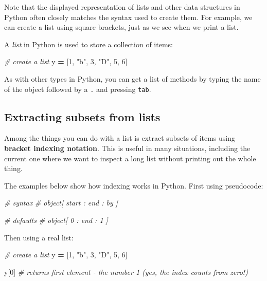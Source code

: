\documentclass[]{book}
\newenvironment{Shaded}{\begin{snugshade}}{\end{snugshade}}
\newcommand{\CommentTok}[1]{\textcolor[rgb]{0.56,0.35,0.01}{\textit{#1}}}
\newcommand{\DecValTok}[1]{\textcolor[rgb]{0.00,0.00,0.81}{#1}}
\newcommand{\NormalTok}[1]{#1}
\newcommand{\OperatorTok}[1]{\textcolor[rgb]{0.81,0.36,0.00}{\textbf{#1}}}
\newcommand{\StringTok}[1]{\textcolor[rgb]{0.31,0.60,0.02}{#1}}
\begin{document}
Note that the displayed representation of lists and other data structures in Python often closely matches the syntax used to create them. For example, we can create a list using square brackets, just as we see when we print a list.

A \emph{list} in Python is used to store a collection of items:

\begin{Shaded}
\begin{Highlighting}[]
\CommentTok{# create a list}
\NormalTok{y }\OperatorTok{=}\NormalTok{ [}\DecValTok{1}\NormalTok{, }\StringTok{"b"}\NormalTok{, }\DecValTok{3}\NormalTok{, }\StringTok{"D"}\NormalTok{, }\DecValTok{5}\NormalTok{, }\DecValTok{6}\NormalTok{]}
\end{Highlighting}
\end{Shaded}

As with other types in Python, you can get a list of methods by typing the name of the object followed by a \texttt{.} and pressing \texttt{tab}.

\hypertarget{extracting-subsets-from-lists}{%
\subsection{Extracting subsets from lists}\label{extracting-subsets-from-lists}}

Among the things you can do with a list is extract subsets of items using \textbf{bracket indexing notation}. This is useful in many situations, including the current one where we want to inspect a long list without printing out the whole thing.

The examples below show how indexing works in Python. First using pseudocode:

\begin{Shaded}
\begin{Highlighting}[]
\CommentTok{# syntax}
\CommentTok{# object[ start : end : by ]}

\CommentTok{# defaults}
\CommentTok{# object[ 0 : end : 1 ]}
\end{Highlighting}
\end{Shaded}

Then using a real list:

\begin{Shaded}
\begin{Highlighting}[]
\CommentTok{# create a list}
\NormalTok{y }\OperatorTok{=}\NormalTok{ [}\DecValTok{1}\NormalTok{, }\StringTok{"b"}\NormalTok{, }\DecValTok{3}\NormalTok{, }\StringTok{"D"}\NormalTok{, }\DecValTok{5}\NormalTok{, }\DecValTok{6}\NormalTok{]}

\NormalTok{y[}\DecValTok{0}\NormalTok{] }\CommentTok{# returns first element - the number 1 (yes, the index counts from zero!)}
\end{Highlighting}
\end{Shaded}
\end{document}
